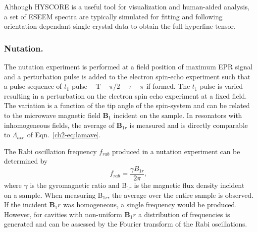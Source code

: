 Although HYSCORE is a useful tool for visualization and human-aided analysis, a set of ESEEM spectra are typically simulated for fitting and following orientation dependant single crystal data to obtain the full hyperfine-tensor. \cite{Shane1994SingleCrystalESEEM}

\subsubsection*{Nutation.}
The nutation experiment is performed at a field position of maximum EPR signal and a perturbation pulse is added to the electron spin-echo experiment such that a pulse sequence of ${t_1\text{-pulse}\!-\!\text{T}\!-\!\pi/2\!-\!\tau\!-\!\pi}$ if formed. The $t_1$-pulse is varied resulting in a perturbation on the electron spin echo experiment at a fixed field. The variation is a function of the tip angle of the spin-system and can be related to the microwave magnetic field $\mathbf{B}_1$ incident on the sample. In resonators with inhomogeneous fields, the average of $\mathbf{B}_{1r}$ is measured and is directly comparable to $\Lambda_{ave}$ of Eqn.~\ref{ch2-eq:lamave}.

The Rabi oscillation frequency $f_{rab}$ produced in a nutation experiment can be determined by
\begin{equation}
  f_{rab} = \frac{\gamma B_{1r}}{2 \pi }, \label{eqB1rrab}
\end{equation}
where $\gamma$ is the gyromagnetic ratio and B$_{1r}$ is the magnetic flux density incident on a sample. When measuring B$_{1r}$, the average over the entire sample is observed. If the incident $\mathbf{B}_1r$ was homogeneous, a single frequency would be produced. However, for cavities with non-uniform $\mathbf{B}_1r$ a distribution of frequencies is generated and can be assessed by the Fourier transform of the Rabi oscillations. 

{\renewcommand{\bibsection}{\clearpage\section*{\bibname}\markboth{\bibname}{\bibname}}
\renewcommand{\bibname}{CHAPTER 2. REFERENCES}


}

